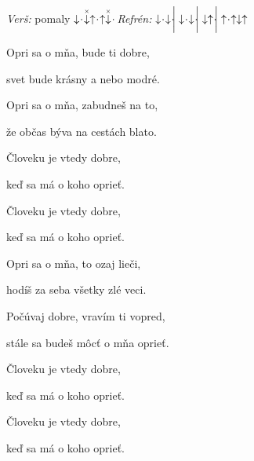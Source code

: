 \begin{song}


 \quad
\textit{Verš:} pomaly $\downarrow\hspace{-0.5ex}\cdot\hspace{-0.5ex}\stackrel{\scriptscriptstyle\times}{\downarrow}\uparrow\hspace{-0.5ex}\cdot\hspace{-0.5ex}\uparrow\stackrel{\scriptscriptstyle\times}{\downarrow}\hspace{-0.5ex}\cdot\hspace{-0.5ex}$ \quad
\textit{Refrén:} $\Down\Miss\Down\Miss \Separator \Down\Miss\Down\Miss \Separator \Down\Up\Miss \Separator \Up\Miss\Up\Down\Up$

\large


\Large

\bigskip

 Opri sa o mňa,  bude ti dobre, \par
{} svet bude krásny  a nebo modré. \par

\bigskip

 Opri sa o mňa,  zabudneš na to, \par
{} že občas býva na cestách blato. \par

\bigskip

  \par
Človeku je vtedy dobre,   \par
keď sa má o koho oprieť.  \par
Človeku je vtedy dobre,   \par
keď sa má o koho oprieť.  \par

\bigskip

 Opri sa o mňa,  to ozaj lieči, \par
{} hodíš za seba všetky zlé veci. \par

\bigskip

 Počúvaj dobre,  vravím ti vopred, \par
{} stále sa budeš môcť o mňa oprieť. \par

\bigskip

  \par
Človeku je vtedy dobre,   \par
keď sa má o koho oprieť.  \par
Človeku je vtedy dobre,   \par
keď sa má o koho oprieť.  \par


\end{song}
